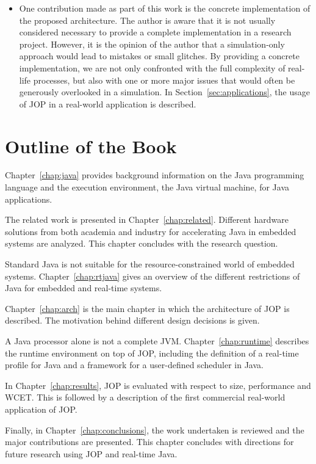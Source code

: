 \begin{itemize}
    \item
One contribution made as part of this work is the concrete
implementation of the proposed architecture. The author is aware
that it is not usually considered necessary to provide a complete
implementation in a research project. However, it is the opinion of
the author that a simulation-only approach would lead to mistakes or
small glitches. By providing a concrete implementation, we are not
only confronted with the full complexity of real-life processes, but
also with one or more major issues that would often be generously
overlooked in a simulation. In Section~\ref{sec:applications}, the
usage of JOP in a real-world application is described.

\end{itemize}

\section{Outline of the Book}

Chapter~\ref{chap:java} provides background information on the Java
programming language and the execution environment, the Java virtual
machine, for Java applications.

The related work is presented in Chapter~\ref{chap:related}.
Different hardware solutions from both academia and industry for
accelerating Java in embedded systems are analyzed. This chapter
concludes with the research question.

Standard Java is not suitable for the resource-constrained world of
embedded systems. Chapter~\ref{chap:rtjava} gives an overview of the
different restrictions of Java for embedded and real-time systems.

Chapter~\ref{chap:arch} is the main chapter in which the
architecture of JOP is described. The motivation behind different
design decisions is given.

A Java processor alone is not a complete JVM.
Chapter~\ref{chap:runtime} describes the runtime environment on top
of JOP, including the definition of a real-time profile for Java and
a framework for a user-defined scheduler in Java.

In Chapter~\ref{chap:results}, JOP is evaluated with respect to
size, performance and WCET. This is followed by a description of the
first commercial real-world application of JOP.

Finally, in Chapter~\ref{chap:conclusions}, the work undertaken is
reviewed and the major contributions are presented. This chapter
concludes with directions for future research using JOP and
real-time Java.
